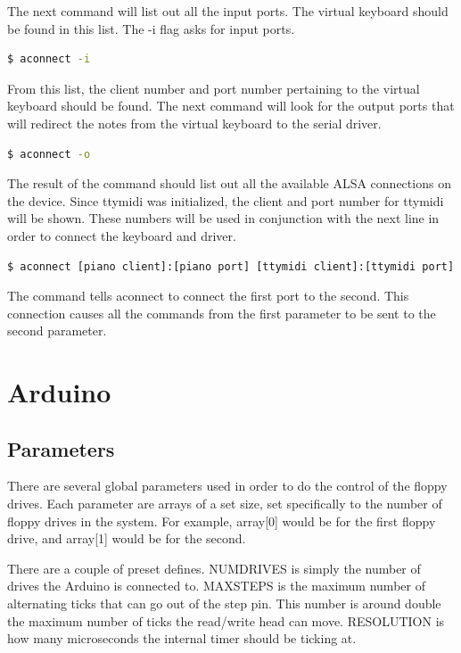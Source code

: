 \documentclass[11pt, a4paper]{report}
\begin{document}
The next command will list out all the input ports. The virtual keyboard should be found in this list. The -i flag asks for input ports.

\begin{lstlisting}[language=bash]
  $ aconnect -i
\end{lstlisting}

From this list, the client number and port number pertaining to the virtual keyboard should be found. The next command will look for the output ports that will redirect the notes from the virtual keyboard to the serial driver. 


\begin{lstlisting}[language=bash]
  $ aconnect -o
\end{lstlisting}

The result of the command should list out all the available ALSA connections on the device. Since ttymidi was initialized, the client and port number for ttymidi will be shown. These numbers will be used in conjunction with the next line in order to connect the keyboard and driver.


\begin{lstlisting}[language=bash]
  $ aconnect [piano client]:[piano port] [ttymidi client]:[ttymidi port]
\end{lstlisting}

The command tells aconnect to connect the first port to the second. This connection causes all the commands from the first parameter to be sent to the second parameter.
    
\chapter{Arduino}

\section{Parameters}
There are several global parameters used in order to do the control of the floppy drives. Each parameter are arrays of a set size, set specifically to the number of floppy drives in the system. For example, array[0] would be for the first floppy drive, and array[1] would be for the second. 



There are a couple of preset defines. NUMDRIVES is simply the number of drives the Arduino is connected to. MAXSTEPS is the maximum number of alternating ticks that can go out of the step pin. This number is around double the maximum number of ticks the read/write head can move. RESOLUTION is how many microseconds the internal timer should be ticking at. \\
\end{document}
